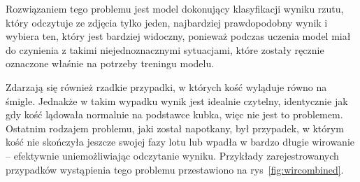 Rozwiązaniem tego problemu jest model dokonujący klasyfikacji wyniku rzutu, który odczytuje ze zdjęcia tylko jeden, najbardziej prawdopodobny wynik i wybiera ten,
który jest bardziej widoczny, ponieważ podczas uczenia model miał do czynienia z takimi niejednoznacznymi sytuacjami,
które zostały ręcznie oznaczone właśnie na potrzeby treningu modelu.

Zdarzają się również rzadkie przypadki, w których kość wyląduje równo na śmigle.
Jednakże w takim wypadku wynik jest idealnie czytelny,
identycznie jak gdy kość lądowała normalnie na podstawce kubka, więc nie jest to problemem.
Ostatnim rodzajem problemu, jaki został napotkany, był przypadek, w którym kość nie skończyła jeszcze swojej fazy lotu
lub wpadła w bardzo długie wirowanie -- efektywnie uniemożliwiając odczytanie wyniku.
Przykłady zarejestrowanych przypadków wystąpienia tego problemu przestawiono na rys~\ref{fig:wircombined}.

